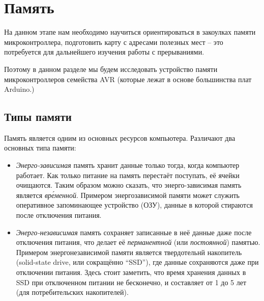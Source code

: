 \documentclass[../sparc.tex]{subfiles}
\begin{document}
\newpage
\section{Память}
\label{section:avr-memory}

На данном этапе нам необходимо научиться ориентироваться в закоулках памяти
микроконтроллера, подготовить карту с адресами полезных мест -- это потребуется
для дальнейшего изучения работы с прерываниями.

Поэтому в данном разделе мы будем исследовать устройство памяти
микроконтроллеров семейства AVR (которые лежат в основе большинства плат
Arduino.)



\subsection{Типы памяти}

Память является одним из основных ресурсов компьютера.  Различают два основных
типа памяти:
\begin{itemize}
\item \emph{Энерго-зависимая} память хранит данные только тогда, когда компьютер
  работает.  Как только питание на память перестаёт поступать, её ячейки
  очищаются.  Таким образом можно сказать, что энерго-зависимая память является
  \emph{вр\'еменной}.  Примером энергозависимой памяти может служить оперативное
  запоминающее устройство (ОЗУ), данные в которой стираются после отключения
  питания.
\item \emph{Энерго-независимая} память сохраняет записанные в неё данные даже
  после отключения питания, что делает её \emph{перманентной} (или
  \emph{постоянной}) памятью.  Примером энергонезависимой памяти является
  твердотельнй накопитель (solid-state drive, или сокращённо ``SSD''), где
  данные сохраняются даже при отключении питания.  Здесь стоит заметить, что
  время хранения данных в SSD при отключенном питании не бесконечно, и
  составляет от 1 до 5 лет (для потребительских
  накопителей).\cite{storedbits:ssd-data-retention}
\end{itemize}
\end{document}
